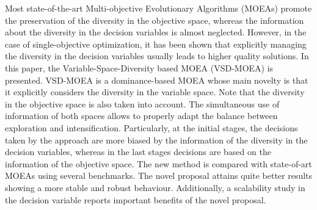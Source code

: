 Most state-of-the-art Multi-objective Evolutionary Algorithms (MOEAs) promote the preservation of the diversity 
in the objective space, whereas the information about the diversity in the decision variables is almost neglected.
%
However, in the case of single-objective optimization, it has been shown that explicitly managing the diversity in the decision
variables usually leads to higher quality solutions.
%
In this paper, the Variable-Space-Diversity based MOEA (VSD-MOEA) is presented.
%
VSD-MOEA is a dominance-based MOEA whose main novelty is that it explicitly considers the diversity in the variable space.
%
Note that the diversity in the objective space is also taken into account.
%
The simultaneous use of information of both spaces allows to properly adapt the balance between exploration and intensification.
%
Particularly, at the initial stages, the decisions taken by the approach are more biased by the information of the diversity in the decision
variables, whereas in the last stages decisions are based on the information of the objective space.
%
The new method is compared with state-of-art MOEAs using several benchmarks.
%
The novel proposal attains quite better results showing a more stable and robust behaviour.
%
Additionally, a scalability study in the decision variable reports important benefits of the novel proposal.
